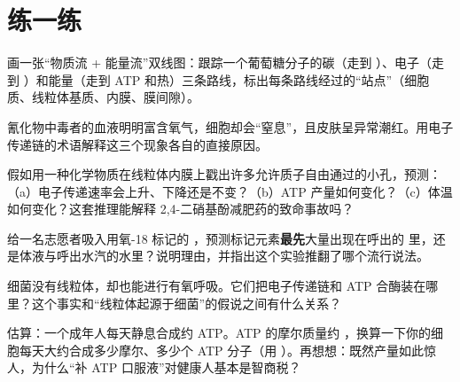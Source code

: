 \section*{练一练}

\begin{sikaoti}
\item 画一张“物质流 + 能量流”双线图：跟踪一个葡萄糖分子的碳（走到 ）、电子（走到 ）和能量（走到 ATP 和热）三条路线，标出每条路线经过的“站点”（细胞质、线粒体基质、内膜、膜间隙）。
\item 氰化物中毒者的血液明明富含氧气，细胞却会“窒息”，且皮肤呈异常潮红。用电子传递链的术语解释这三个现象各自的直接原因。
\item 假如用一种化学物质在线粒体内膜上戳出许多允许质子自由通过的小孔，预测：（a）电子传递速率会上升、下降还是不变？（b）ATP 产量如何变化？（c）体温如何变化？这套推理能解释 2,4-二硝基酚减肥药的致命事故吗？
\item 给一名志愿者吸入用氧-18 标记的 ，预测标记元素\textbf{最先}大量出现在呼出的  里，还是体液与呼出水汽的水里？说明理由，并指出这个实验推翻了哪个流行说法。
\item 细菌没有线粒体，却也能进行有氧呼吸。它们把电子传递链和 ATP 合酶装在哪里？这个事实和“线粒体起源于细菌”的假说之间有什么关系？
\item 估算：一个成年人每天静息合成约  ATP。ATP 的摩尔质量约 ，换算一下你的细胞每天大约合成多少摩尔、多少个 ATP 分子（用 ）。再想想：既然产量如此惊人，为什么“补 ATP 口服液”对健康人基本是智商税？
\end{sikaoti}
